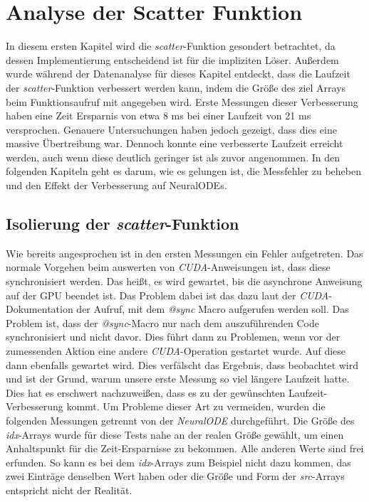 
\section{Analyse der Scatter Funktion}

In diesem ersten Kapitel wird die \textit{scatter}-Funktion gesondert betrachtet, da
dessen Implementierung entscheidend ist für die impliziten Löser.
Außerdem wurde während der Datenanalyse für dieses Kapitel entdeckt,
dass die Laufzeit der \textit{scatter}-Funktion verbessert werden kann, 
indem die Größe des ziel Arrays beim Funktionsaufruf mit angegeben wird.
Erste Messungen dieser Verbesserung haben eine Zeit Ersparnis von etwa 8 ms bei einer Laufzeit von 21 ms 
versprochen.
Genauere Untersuchungen haben jedoch gezeigt, dass dies eine massive Übertreibung war.
Dennoch konnte eine verbesserte Laufzeit erreicht werden, auch wenn diese deutlich geringer ist als zuvor angenommen.
In den folgenden Kapiteln geht es darum, wie es gelungen ist, die Messfehler zu beheben und den Effekt der Verbesserung auf NeuralODEs.


\subsection{Isolierung der \textit{scatter}-Funktion}

Wie bereits angesprochen ist in den ersten Messungen ein Fehler aufgetreten.
Das normale Vorgehen beim auswerten von \textit{CUDA}-Anweisungen ist, 
dass diese synchronisiert werden.
Das heißt, es wird gewartet, bis die asynchrone Anweisung auf der GPU beendet ist.
Das Problem dabei ist das dazu laut der \textit{CUDA}-Dokumentation der Aufruf, mit dem \textit{@sync} Macro aufgerufen werden soll.
Das Problem ist, dass der \textit{@sync}-Macro nur nach dem auszuführenden Code synchronisiert und nicht davor.
Dies führt dann zu Problemen, wenn vor der zumessenden Aktion eine andere \textit{CUDA}-Operation gestartet wurde.
Auf diese dann ebenfalls gewartet wird. 
Dies verfälscht das Ergebnis, dass beobachtet wird und ist der Grund, warum unsere erste Messung so viel längere Laufzeit hatte.
Dies hat es erschwert nachzuweißen, dass es zu der gewünschten Laufzeit-Verbesserung kommt.
Um Probleme dieser Art zu vermeiden, wurden die folgenden Messungen getrennt von der \textit{NeuralODE} durchgeführt.
Die Größe des \textit{idx}-Arrays wurde für diese Tests nahe an der realen Größe gewählt, um einen Anhaltspunkt für die Zeit-Ersparnisse zu bekommen.
Alle anderen Werte sind frei erfunden.
So kann es bei dem \textit{idx}-Arrays zum Beispiel nicht dazu kommen, 
das zwei Einträge denselben Wert haben oder die Größe und Form der \textit{src}-Arrays entspricht nicht der Realität.

